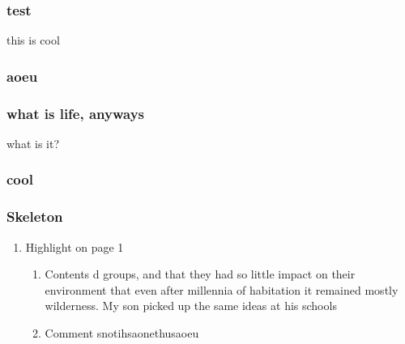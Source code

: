 \documentclass[letterpaper]{article}
\begin{document}
\subsubsection{test}
\label{sec:org5783b23}
this is cool
\subsubsection{aoeu}
\label{sec:org73d40d2}
\subsubsection{what is life, anyways}
\label{sec:orgc496ce8}
what is it?
\subsubsection{cool}
\label{sec:org45b78e5}

\subsubsection{Skeleton}
\label{sec:org2ae34cc}
\begin{enumerate}
\item Highlight on page 1
\label{sec:org15f2955}
\begin{enumerate}
\item Contents
\label{sec:org999b681}
d groups, and that they had so little impact on their environment that even
after millennia of habitation it remained mostly wilderness. My son picked up the
same ideas at his schools
\item Comment
\label{sec:org9095873}
snotihsaonethusaoeu
\end{enumerate}
\end{enumerate}
\end{document}
